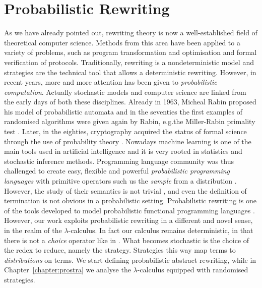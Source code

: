 \section{Probabilistic Rewriting}
As we have already pointed out, rewriting theory is now a well-established field of theoretical computer science. Methods from this area have been applied to a variety of problems, such as program transformation and optimisation and formal verification of protocols. Traditionally, rewriting is a nondeterministic model and strategies are the technical tool that allows a deterministic rewriting. However, in recent years, more and more attention has been given to \emph{probabilistic computation}. Actually stochastic models and computer science are linked from the early days of both these disciplines. Already in 1963, Micheal Rabin proposed his model of probabilistic automata \cite{rabin_probabilistic_1963} and in the seventies the first examples of randomised algorithms were given again by Rabin, e.g.the Miller-Rabin primality test \cite{rabin_probabilistic_1980}. Later, in the eighties, cryptography acquired the status of formal science through the use of probability theory \cite{goldreich_how_1984}. Nowadays machine learning is one of the main tools used in artificial intelligence and it is very rooted in statistics and stochastic inference methods. Programming language community was thus challenged to create easy, flexible and powerful \emph{probabilistic programming languages} with primitive operators such us the \emph{sample} from a distribution \cite{goodman_church:_2008,wood_new_2014}. However, the study of their semantics is not trivial \cite{staton_semantics_2016}, and even the definition of termination is not obvious in a probabilistic setting. Probabilistic rewriting is one of the tools developed to model  probabilistic functional programming languages \cite{avanzini_probabilistic_2018}. However, our work exploits probabilistic rewriting in a different and novel sense, in the realm of the $\lambda$-calculus. In fact our calculus remains deterministic, in that there is not a \emph{choice} operator like in \cite{borgstrom_lambda-calculus_2016}. What becomes stochastic is the choice of the redex to reduce, namely the strategy. Strategies this way map terms to \emph{distributions} on terms. We start defining probabilistic abstract rewriting, while in Chapter~\ref{chapter:prostra} we analyse the $\lambda$-calculus equipped with randomised strategies.
